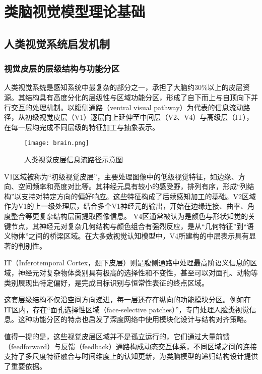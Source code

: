 
\chapter{类脑视觉模型理论基础}

\section{人类视觉系统启发机制}

\subsection{视觉皮层的层级结构与功能分区}

人类视觉系统是感知系统中最复杂的部分之一，承担了大脑约30\%以上的皮层资源。其结构具有高度分化的层级性与区域功能分区，形成了自下而上与自顶向下并行交互的处理机制。以腹侧通路（ventral visual pathway）为代表的信息流动路径，从初级视觉皮层（V1）逐层向上延伸至中间层（V2、V4）与高级层（IT），在每一层均完成不同层级的特征加工与抽象表示\cite{ kanwisher2010functional}。

\begin{figure}[hbt]
	\centering
	\texttt{[image: brain.png]}
	\caption{人类视觉皮层信息流路径示意图}
	\label{f.naoquyu}
\end{figure}

V1区域被称为“初级视觉皮层”，主要处理图像中的低级视觉特征，如边缘、方向、空间频率和亮度对比等。其神经元具有较小的感受野，排列有序，形成“列结构”以支持对特定方向的偏好响应。这些特征构成了后续感知加工的基础。V2区域作为V1的上一级处理层，结合多个V1神经元的输出，开始在边缘连接、曲率、角度整合等更复杂结构层面提取图像信息。
V4区通常被认为是颜色与形状知觉的关键节点，其神经元对复杂几何结构与颜色组合有强烈反应，是从“几何特征”到“语义物体”之间的桥梁区域。在大多数视觉认知模型中，V4所建构的中层表示具有显著的判别性。

IT（Inferotemporal Cortex，颞下皮层）则是腹侧通路中处理最高阶语义信息的区域，神经元对复杂物体类别具有极高的选择性和不变性，甚至可以对面孔、动物等类别展现出特定偏好，是完成目标识别与恒常性表征的终点区域。

这套层级结构不仅沿空间方向递进，每一层还存在纵向的功能模块分区。例如在IT区内，存在“面孔选择性区域（face-selective patches）”，专门处理人脸类视觉信息。这种功能分区的特点也启发了深度网络中使用模块化设计与结构对齐策略。

值得一提的是，这些视觉皮层区域并不是孤立运行的，它们通过大量前馈（feedforward）与反馈（feedback）通路构成动态交互体系，不同区域之间的连接支持了多尺度特征融合与时间维度上的认知更新，为类脑模型的递归结构设计提供了重要依据\cite{yamins2016using}。


